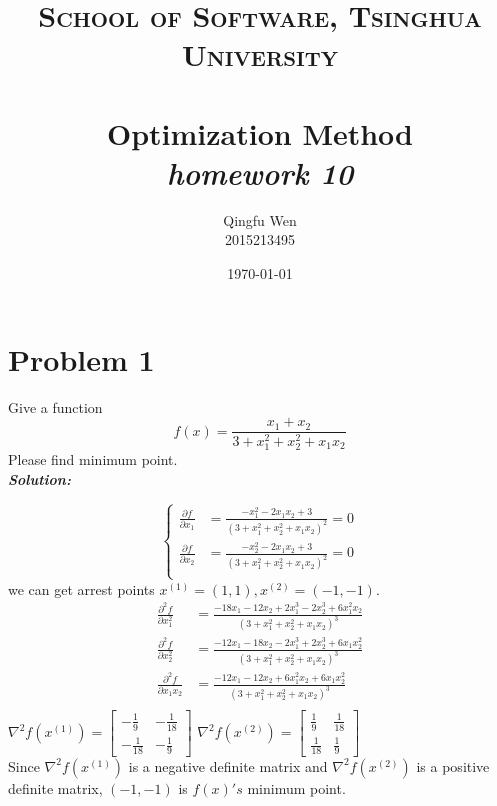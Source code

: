 \documentclass[paper=a4, fontsize=11pt]{scrartcl} %
\title{	
\normalfont \normalsize
\textsc{School of Software, Tsinghua University} \\ [25pt] %
\horrule{0.5pt} \\[0.4cm] %
\huge Optimization Method\\ %
\LARGE\textit{homework 10}
\horrule{2pt} \\[0.5cm] %
}
\author{Qingfu Wen \\ \normalsize 2015213495} %
\date{\normalsize\today} %
\numberwithin{equation}{section} %
\numberwithin{figure}{section} %
\numberwithin{table}{section} %
\begin{document}
\maketitle %
\tableofcontents
\newpage
\section{Problem 1}
Give a function
\begin{equation}
f(x) = \frac{x_1+x_2}{3+x_1^2+x_2^2+x_1x_2}  \nonumber
\end{equation}
Please find minimum point.\\
\emph{\textbf{Solution:}}

\begin{equation}
\left\{
\begin{aligned}
\frac{\partial f}{\partial x_1} &= \frac{-x_1^2-2x_1x_2+3}{(3+x_1^2+x_2^2+x_1x_2)^2} =0\\
\frac{\partial f}{\partial x_2} &= \frac{-x_2^2-2x_1x_2+3}{(3+x_1^2+x_2^2+x_1x_2)^2} =0\\
\end{aligned} 
\right. \nonumber
\end{equation}
we can get arrest points $x^{(1)}=(1,1), x^{(2)}=(-1,-1)$.\\
\begin{align} \nonumber
\frac{\partial^2 f}{\partial x_1^2} &= \frac{-18x_1-12x_2+2x_1^3-2x_2^3+6x_1^2x_2}{(3+x_1^2+x_2^2+x_1x_2)^3}\\\nonumber
\frac{\partial^2 f}{\partial x_2^2} &= \frac{-12x_1-18x_2-2x_1^3+2x_2^3+6x_1x_2^2}{(3+x_1^2+x_2^2+x_1x_2)^3}\\\nonumber
\frac{\partial^2 f}{\partial x_1x_2} &= \frac{-12x_1-12x_2+6x_1^2x_2+6x_1x_2^2}{(3+x_1^2+x_2^2+x_1x_2)^3}\\\nonumber
\end{align}
$\nabla^2 f(x^{(1)}) = \begin{bmatrix} -\frac{1}{9} & -\frac{1}{18} \\ -\frac{1}{18} & -\frac{1}{9}\end{bmatrix}$ \qquad
$\nabla^2 f(x^{(2)}) = \begin{bmatrix} \frac{1}{9} & \frac{1}{18} \\ \frac{1}{18} & \frac{1}{9}\end{bmatrix}$ \\
Since $\nabla^2 f(x^{(1)})$ is a negative definite matrix and $\nabla^2 f(x^{(2)})$ is a positive definite matrix, $(-1, -1)$ is $f(x)'s$ minimum point.
\end{document}

